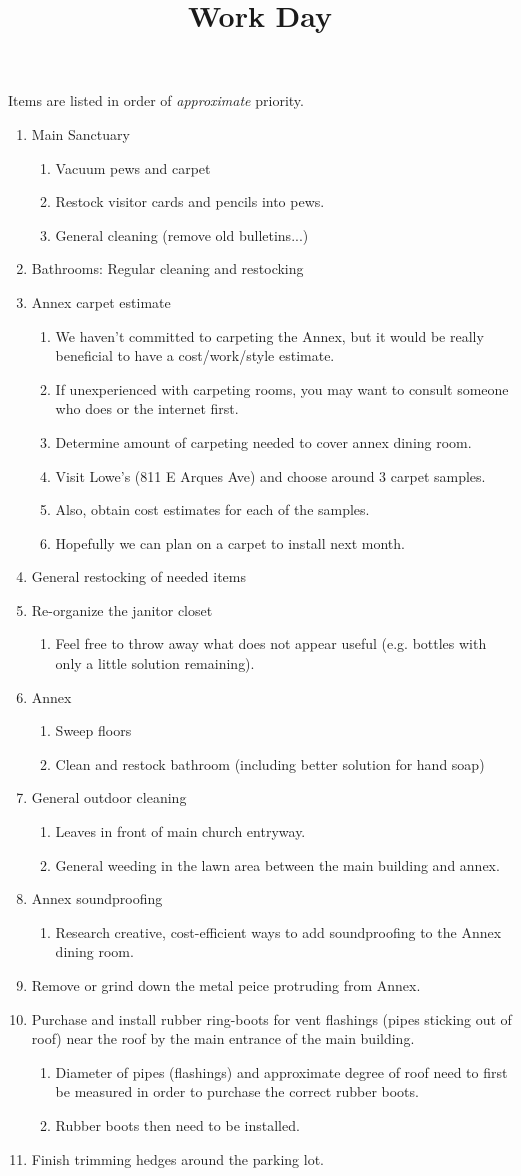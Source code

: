 \documentclass[12pt]{article}
\title{Work Day}
\newcommand{\BI}{\begin{enumerate}\item}
\newcommand{\I}{\item}
\newcommand{\EI}{\end{enumerate}}
\begin{document}
\maketitle
Items are listed in order of \emph{approximate} priority. 
\BI Main Sanctuary
    \BI Vacuum pews and carpet
    \I  Restock visitor cards and pencils into pews.
    \I  General cleaning (remove old bulletins...) \EI
\I  Bathrooms: Regular cleaning and restocking
\I  Annex carpet estimate 
    \BI We haven't committed to carpeting the Annex, 
        but it would be really beneficial to have a cost/work/style estimate.
    \I  If unexperienced with carpeting rooms, you may want to consult someone
        who does or the internet first.
    \I  Determine amount of carpeting needed to cover annex dining room.
    \I  Visit Lowe's (811 E Arques Ave) and choose around 3 carpet samples.
    \I  Also, obtain cost estimates for each of the samples.
    \I  Hopefully we can plan on a carpet to install next month. \EI
\I  General restocking of needed items
\I  Re-organize the janitor closet
    \BI Feel free to throw away what does not appear useful
        (e.g. bottles with only a little solution remaining). \EI
\I  Annex
    \BI Sweep floors
    \I  Clean and restock bathroom (including better solution for hand soap) \EI
\I  General outdoor cleaning
    \BI Leaves in front of main church entryway.
    \I  General weeding in the lawn area between the main building and annex. \EI
\I  Annex soundproofing
    \BI Research creative, cost-efficient ways to add soundproofing to the
        Annex dining room. \EI
\I  Remove or grind down the metal peice protruding from Annex.
\I  Purchase and install rubber ring-boots for vent flashings 
    (pipes sticking out of roof) near the roof by the main entrance 
    of the main building.
    \BI Diameter of pipes (flashings) and approximate degree of roof 
        need to first be measured in order to purchase the correct rubber boots.
    \I  Rubber boots then need to be installed. \EI
\I  Finish trimming hedges around the parking lot. 
\EI
\end{document}
